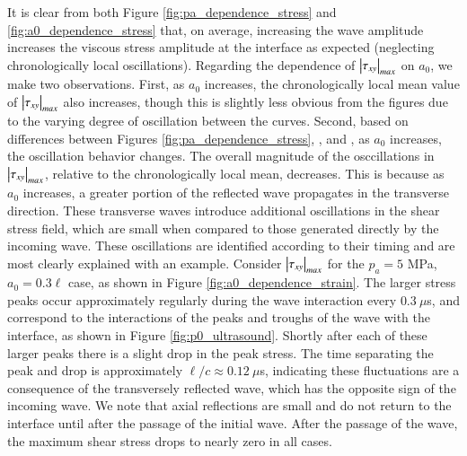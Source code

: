 It is clear from both Figure \ref{fig:pa_dependence_stress} and
\ref{fig:a0_dependence_stress} that, on average, increasing the wave
amplitude increases the viscous stress amplitude at the interface as
expected (neglecting chronologically local oscillations). Regarding
the dependence of $\left|\tau_{xy}\right|_{max}$ on $a_0$, we make two
observations. First, as $a_0$ increases, the chronologically local
mean value of $\left|\tau_{xy}\right|_{max}$ also increases, though this is
slightly less obvious from the figures due to the varying degree of
oscillation between the curves. Second, based on differences between
Figures
\ref{fig:pa_dependence_stress},
, and
, as $a_0$ increases, the oscillation
behavior changes. The overall magnitude of the osccillations in
$\left|\tau_{xy}\right|_{max}$, relative to the chronologically local mean,
decreases. This is because as $a_0$ increases, a greater portion of
the reflected wave propagates in the transverse direction. These
transverse waves introduce additional oscillations in the shear stress
field, which are small when compared to those generated directly by
the incoming wave. These oscillations are identified according to
their timing and are most clearly explained with an example. Consider
$\left|\tau_{xy}\right|_{max}$ for the $p_a=5$ MPa, $a_0=0.3\ell$ case, as
shown in Figure
\ref{fig:a0_dependence_strain}. The
larger stress peaks occur approximately regularly during the wave
interaction every $0.3~\mu$s, and correspond to the interactions of
the peaks and troughs of the wave with the interface, as shown in
Figure \ref{fig:p0_ultrasound}. Shortly after each of these larger
peaks there is a slight drop in the peak stress. The time separating
the peak and drop is approximately $\ell/c\approx0.12~\mu$s,
indicating these fluctuations are a consequence of the transversely
reflected wave, which has the opposite sign of the incoming wave. We
note that axial reflections are small and do not return to the
interface until after the passage of the initial wave. After the
passage of the wave, the maximum shear stress drops to nearly zero in
all cases.

